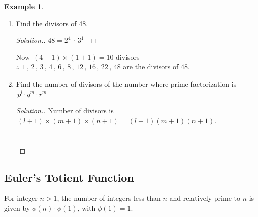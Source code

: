 \documentclass[11pt,a4paper]{article}
\theoremstyle{definition}
\newtheorem{exa}[thm]{Example}
\newenvironment{solution}
  {\renewcommand{\qedsymbol}{}\begin{proof}[\textit{Solution}.]}
  {\end{proof}}
\begin{document}
\begin{exa}
\begin{enumerate}
\item Find the divisors of 48.\\

\begin{solution}
$48 = 2^4\, \cdot\, 3^1$\
\end{solution}

Now $\, (4 + 1)\times (1 + 1)  = 10$ divisors\\

$\therefore\, \, 1\, , \, 2\, , \, 3\, , \, 4\, , \, 6\, , \, 8\, , \, 12\, , \, 16\, , \, 22\, , \, 48$ are the divisors of $48$.\\


\item Find the number of divisors of the number where prime factorization is $\, p^l \cdot q^m \cdot r^m$\\

\begin{solution}
Number of divisors is  $\, (l + 1)\times (m+1)\times (n+1) = (l+1)(m+1)(n+1)$.\\\\\\
\end{solution}
\end{enumerate}
\end{exa}







\subsection{Euler's Totient Function}
For integer $n>1$, the number of integers less than $n$ and relatively prime to $n$ is given by $\phi(n)\cdot\phi(1)$, with $\phi(1) = 1$.\\\\
\end{document}
